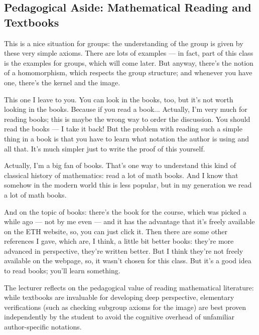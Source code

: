 \subsection{Pedagogical Aside: Mathematical Reading and Textbooks}

\begin{speech}[00:28:05 - 00:29:38]
This is a nice situation for groups: the understanding of the group is given by these very simple axioms. There are lots of examples --- in fact, part of this class is the examples for groups, which will come later. But anyway, there's the notion of a homomorphism, which respects the group structure; and whenever you have one, there's the kernel and the image.

This one I leave to you. You can look in the books, too, but it's not worth looking in the books. Because if you read a book... Actually, I'm very much for reading books; this is maybe the wrong way to order the discussion. You should read the books --- I take it back! But the problem with reading such a simple thing in a book is that you have to learn what notation the author is using and all that. It's much simpler just to write the proof of this yourself.

Actually, I'm a big fan of books. That's one way to understand this kind of classical history of mathematics: read a lot of math books. And I know that somehow in the modern world this is less popular, but in my generation we read a lot of math books.

And on the topic of books: there's the book for the course, which was picked a while ago --- not by me even --- and it has the advantage that it's freely available on the ETH website, so, you can just click it. Then there are some other references I gave, which are, I think, a little bit better books: they're more advanced in perspective, they're written better. But I think they're not freely available on the webpage, so, it wasn't chosen for this class. But it's a good idea to read books; you'll learn something.
\end{speech}

\begin{note}
The lecturer reflects on the pedagogical value of reading mathematical literature: while textbooks are invaluable for developing deep perspective, elementary verifications (such as checking subgroup axioms for the image) are best proven independently by the student to avoid the cognitive overhead of unfamiliar author-specific notations.
\end{note}

